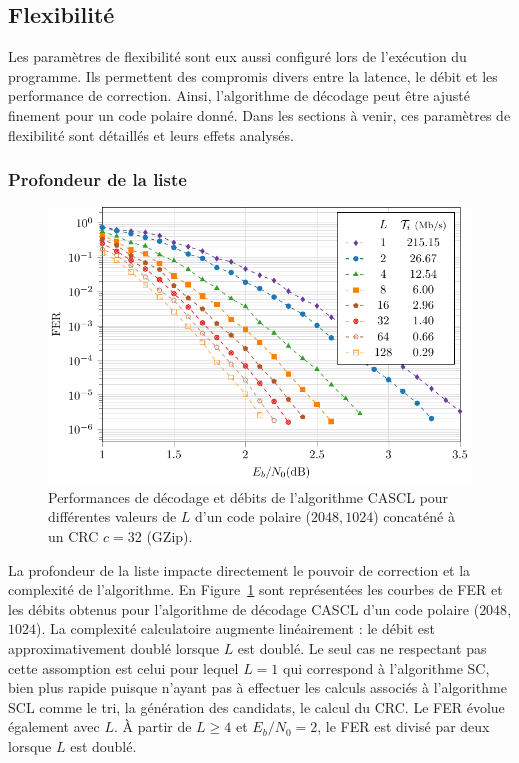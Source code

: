 \subsection{Flexibilité}
Les paramètres de flexibilité sont eux aussi configuré lors de l'exécution du programme. Ils permettent des compromis divers entre la latence, le débit et les performance de correction. Ainsi, l'algorithme de décodage peut être ajusté finement pour un code polaire donné. Dans les sections à venir, ces paramètres de flexibilité sont détaillés et leurs effets analysés.

\subsubsection{Profondeur de la liste}
\begin{figure}[t]
\includegraphics[width=\textwidth]{main/ch2_fig/curves/L/tikz/L}
\caption{Performances de décodage et débits de l'algorithme CASCL pour différentes valeurs de $L$ d'un code polaire ($2048,1024$) concaténé à un CRC $c=32$ (GZip).}
\label{fig:scl_l}
\end{figure}
La profondeur de la liste impacte directement le pouvoir de correction et la complexité de l'algorithme. En Figure~\ref{fig:scl_l} sont représentées les courbes de FER et les débits obtenus pour l'algorithme de décodage CASCL d'un code polaire ($2048$,$1024$). La complexité calculatoire augmente linéairement : le débit est approximativement doublé lorsque $L$ est doublé. Le seul cas ne respectant pas cette assomption est celui pour lequel $L=1$ qui correspond à l'algorithme SC, bien plus rapide puisque n'ayant pas à effectuer les calculs associés à l'algorithme SCL comme le tri, la génération des candidats, le calcul du CRC. Le FER évolue également avec $L$. \`A partir de $L\geq4$ et $E_b/N_0=2$, le FER est divisé par deux lorsque $L$ est doublé.

